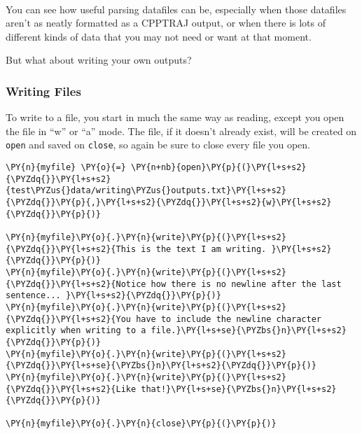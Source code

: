     \begin{center}
    \end{center}
    { \hspace*{\fill} \\}
    
    You can see how useful parsing datafiles can be, especially when those
datafiles aren't as neatly formatted as a CPPTRAJ output, or when there
is lots of different kinds of data that you may not need or want at that
moment.

But what about writing your own outputs?

\hypertarget{writing-files}{%
\subsubsection{Writing Files}\label{writing-files}}

To write to a file, you start in much the same way as reading, except
you open the file in ``w'' or ``a'' mode. The file, if it doesn't
already exist, will be created on \texttt{open} and saved on
\texttt{close}, so again be sure to close every file you open.

    \begin{tcolorbox}[breakable, size=fbox, boxrule=1pt, pad at break*=1mm,colback=cellbackground, colframe=cellborder]
\begin{Verbatim}[commandchars=\\\{\}]
\PY{n}{myfile} \PY{o}{=} \PY{n+nb}{open}\PY{p}{(}\PY{l+s+s2}{\PYZdq{}}\PY{l+s+s2}{test\PYZus{}data/writing\PYZus{}outputs.txt}\PY{l+s+s2}{\PYZdq{}}\PY{p}{,}\PY{l+s+s2}{\PYZdq{}}\PY{l+s+s2}{w}\PY{l+s+s2}{\PYZdq{}}\PY{p}{)}

\PY{n}{myfile}\PY{o}{.}\PY{n}{write}\PY{p}{(}\PY{l+s+s2}{\PYZdq{}}\PY{l+s+s2}{This is the text I am writing. }\PY{l+s+s2}{\PYZdq{}}\PY{p}{)}
\PY{n}{myfile}\PY{o}{.}\PY{n}{write}\PY{p}{(}\PY{l+s+s2}{\PYZdq{}}\PY{l+s+s2}{Notice how there is no newline after the last sentence... }\PY{l+s+s2}{\PYZdq{}}\PY{p}{)}
\PY{n}{myfile}\PY{o}{.}\PY{n}{write}\PY{p}{(}\PY{l+s+s2}{\PYZdq{}}\PY{l+s+s2}{You have to include the newline character explicitly when writing to a file.}\PY{l+s+se}{\PYZbs{}n}\PY{l+s+s2}{\PYZdq{}}\PY{p}{)}
\PY{n}{myfile}\PY{o}{.}\PY{n}{write}\PY{p}{(}\PY{l+s+s2}{\PYZdq{}}\PY{l+s+se}{\PYZbs{}n}\PY{l+s+s2}{\PYZdq{}}\PY{p}{)}
\PY{n}{myfile}\PY{o}{.}\PY{n}{write}\PY{p}{(}\PY{l+s+s2}{\PYZdq{}}\PY{l+s+s2}{Like that!}\PY{l+s+se}{\PYZbs{}n}\PY{l+s+s2}{\PYZdq{}}\PY{p}{)}

\PY{n}{myfile}\PY{o}{.}\PY{n}{close}\PY{p}{(}\PY{p}{)}
\end{Verbatim}
\end{tcolorbox}

